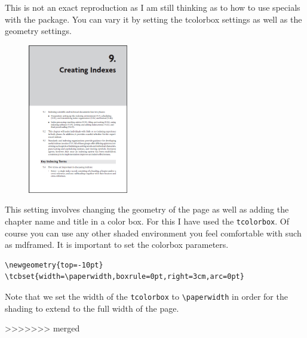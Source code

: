 This is not an exact reproduction as I am still thinking as to how to use
specials with the package. You can vary it by setting the tcolorbox settings as well as the geometry settings.
\medskip
\begin{figure}[ht]
\centering
\includegraphics[width=0.39\textwidth]{./chapters/chapter03}
\end{figure}

This setting involves changing the geometry of the page as well as adding the chapter name and title in a color box. For this I have used the \lstinline{tcolorbox}. Of course you can use any other shaded environment you feel comfortable with such as mdframed. It is important to set the colorbox parameters.

\begin{lstlisting}
\newgeometry{top=-10pt}
\tcbset{width=\paperwidth,boxrule=0pt,right=3cm,arc=0pt}
\end{lstlisting}

Note that we set the width of the \lstinline{tcolorbox} to \lstinline{\paperwidth} in order for the shading to extend to the full width of the page.

\restoregeometry
>>>>>>> merged
